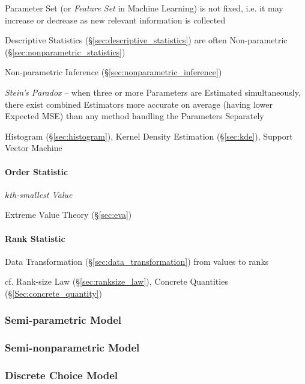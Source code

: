 Parameter Set (or \emph{Feature Set} in Machine Learning) is not fixed, i.e. it
may increase or decrease as new relevant information is collected

Descriptive Statistics (\S\ref{sec:descriptive_statistics}) are often
Non-parametric (\S\ref{sec:nonparametric_statistics})

\fist Non-parametric Inference (\S\ref{sec:nonparametric_inference})

\emph{Stein's Paradox} -- when three or more Parameters are Estimated
simultaneously, there exist combined Estimators more accurate on average (having
lower Expected MSE) than any method handling the Parameters Separately

Histogram (\S\ref{sec:histogram}), Kernel Density Estimation (\S\ref{sec:kde}),
Support Vector Machine



\paragraph{Order Statistic}\label{sec:order_statistic}\hfill

\emph{$k$th-smallest Value}

Extreme Value Theory (\S\ref{sec:eva})



\paragraph{Rank Statistic}\label{sec:rank_statistic}\hfill

Data Transformation (\S\ref{sec:data_transformation}) from values to ranks

cf. Rank-size Law (\S\ref{sec:ranksize_law}), Concrete Quantities
(\S\ref{Sec:concrete_quantity})



\subsubsection{Semi-parametric Model}\label{sec:semiparametric_model}

\subsubsection{Semi-nonparametric Model}\label{sec:seminonparametric_model}

\subsubsection{Discrete Choice Model}\label{sec:discrete_choice_model}

